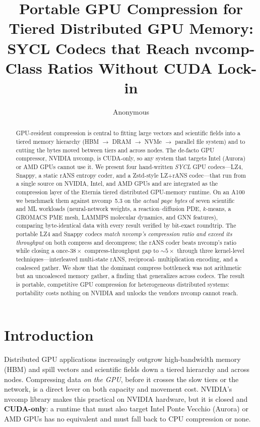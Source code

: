 \documentclass[sigconf,review,anonymous]{acmart}
\begin{document}
\title{Portable GPU Compression for Tiered Distributed GPU Memory:
SYCL Codecs that Reach nvcomp-Class Ratios Without CUDA Lock-in}

\author{Anonymous}

\begin{abstract}
GPU-resident compression is central to fitting large vectors and scientific
fields into a tiered memory hierarchy (HBM $\rightarrow$ DRAM $\rightarrow$ NVMe
$\rightarrow$ parallel file system) and to cutting the bytes moved between tiers
and across nodes. The de-facto GPU compressor, NVIDIA nvcomp, is CUDA-only, so
any system that targets Intel (Aurora) or AMD GPUs cannot use it. We present four
hand-written \emph{SYCL} GPU codecs---LZ4, Snappy, a static rANS entropy coder,
and a Zstd-style LZ+rANS codec---that run from a single source on NVIDIA, Intel,
and AMD GPUs and are integrated as the compression layer of the Eternia tiered
distributed GPU-memory runtime. On an A100 we benchmark them against nvcomp~5.3
on the \emph{actual page bytes} of seven scientific and ML workloads
(neural-network weights, a reaction--diffusion PDE, $k$-means, a GROMACS PME
mesh, LAMMPS molecular dynamics, and GNN features), comparing byte-identical
data with every result verified by bit-exact roundtrip. The portable LZ4 and
Snappy codecs \emph{match nvcomp's compression ratio and exceed its throughput}
on both compress and decompress; the rANS coder beats nvcomp's ratio while
closing a once-$38\times$ compress-throughput gap to $\sim$$5\times$ through
three kernel-level techniques---interleaved multi-state rANS, reciprocal-%
multiplication encoding, and a coalesced gather. We show that the dominant
compress bottleneck was not arithmetic but an uncoalesced memory gather, a
finding that generalizes across codecs. The result is portable, competitive GPU
compression for heterogeneous distributed systems: portability costs nothing on
NVIDIA and unlocks the vendors nvcomp cannot reach.
\end{abstract}


\maketitle

\section{Introduction}
Distributed GPU applications increasingly outgrow high-bandwidth memory (HBM) and
spill vectors and scientific fields down a tiered hierarchy and across nodes.
Compressing data \emph{on the GPU}, before it crosses the slow tiers or the
network, is a direct lever on both capacity and movement cost. NVIDIA's nvcomp
library makes this practical on NVIDIA hardware, but it is closed and
\textbf{CUDA-only}: a runtime that must also target Intel Ponte Vecchio (Aurora)
or AMD GPUs has no equivalent and must fall back to CPU compression or none.
\end{document}
